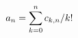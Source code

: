\documentclass[preview]{standalone}
\begin{document}
\begin{align*}
\special{dvisvgm:raw <g id='unique000'>}a_n=\sum_{k=0}^{n}c_{k,n}/k!\special{dvisvgm:raw </g>}
\end{align*}
\end{document}
